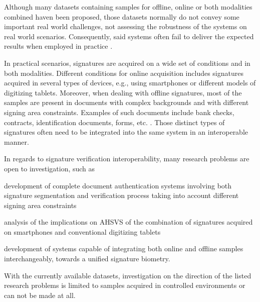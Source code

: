 Although many datasets containing samples for offline, online or both modalities combined haven been proposed, those datasets normally do not convey some important real world challenges, not assessing the robustness of the systems on real world scenarios. Consequently, said systems often fail to deliver the expected results when employed in practice \cite{towards2013}.

In practical scenarios, signatures are acquired on a wide set of conditions and in both modalities. Different conditions for online acquisition includes signatures acquired in several types of devices, e.g., using smartphones or different models of digitizing tablets. Moreover, when dealing with offline signatures, most of the samples are present in documents with complex backgrounds and with different signing area constraints. Examples of such documents include bank checks, contracts, identification documents, forms, etc. \cite{towards2013, liwicki-sigseg}. Those distinct types of signatures often need to be integrated into the same system in an interoperable manner.


In regards to signature verification interoperability, many research problems are open to investigation, such as
\begin{inlinelist}
  \item development of complete document authentication systems involving both signature segmentation and verification process taking into account different signing area constraints
  \item analysis of the implications on AHSVS of the combination of signatures acquired on smartphones and conventional digitizing tablets
  \item development of systems capable of integrating both online and offline samples interchangeably, towards a unified signature biometry.
\end{inlinelist}
With the currently available datasets, investigation on the direction of the listed research problems is limited to samples acquired in controlled environments or can not be made at all.

